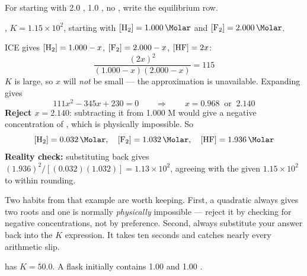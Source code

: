 \documentclass{apchem-notes}
\begin{document}

For  starting with \SI{2.0}{\Molar} ,
\SI{1.0}{\Molar} , no , write the equilibrium row.



\begin{workedexample}
, $K = 1.15\times10^{2}$, starting with
$[\ce{H2}] = \SI{1.000}{\Molar}$ and $[\ce{F2}] = \SI{2.000}{\Molar}$.

ICE gives $[\ce{H2}] = 1.000-x$, $[\ce{F2}] = 2.000-x$, $[\ce{HF}] = 2x$:
\[
  \frac{(2x)^2}{(1.000-x)(2.000-x)} = 115
\]
$K$ is large, so $x$ will \emph{not} be small --- the approximation is
unavailable. Expanding gives
\[
  111x^2 - 345x + 230 = 0
  \qquad\Rightarrow\qquad
  x = 0.968 \ \text{ or } \ 2.140
\]
\textbf{Reject $x = 2.140$}: subtracting it from 1.000 M would give a
negative concentration of , which is physically impossible. So
\[
  [\ce{H2}] = \SI{0.032}{\Molar},\quad
  [\ce{F2}] = \SI{1.032}{\Molar},\quad
  [\ce{HF}] = \SI{1.936}{\Molar}
\]
\textbf{Reality check:} substituting back gives
$(1.936)^2/[(0.032)(1.032)] = 1.13\times10^{2}$, agreeing with the given
$1.15\times10^{2}$ to within rounding. \checkmark
\end{workedexample}

\begin{apcnote}
Two habits from that example are worth keeping. First, a quadratic always
gives two roots and one is normally \emph{physically} impossible --- reject
it by checking for negative concentrations, not by preference. Second,
always substitute your answer back into the $K$ expression. It takes ten
seconds and catches nearly every arithmetic slip.
\end{apcnote}


 has $K = 50.0$. A flask initially contains
\SI{1.00}{\Molar}  and \SI{1.00}{\Molar} .
\end{document}
